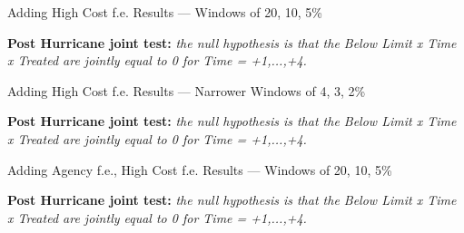 \documentclass{article}
\begin{document}
\clearpage
\pagebreak

\begin{sidewaystable}
    
    \caption{Adding High Cost f.e. Results --- Windows of 20, 10, 5\%}
                
    \begin{center}
    
    \end{center}
                
    \textbf{Post Hurricane joint test:} \emph{the null hypothesis is that the Below Limit x Time x Treated are jointly equal to 0 for Time = +1,...,+4.}

\end{sidewaystable}
                
\clearpage
\pagebreak

\begin{sidewaystable}
    
    \caption{Adding High Cost f.e. Results --- Narrower Windows of 4, 3, 2\%}
                 
    \begin{center}
    
    \end{center}
                
    \textbf{Post Hurricane joint test:} \emph{the null hypothesis is that the Below Limit x Time x Treated are jointly equal to 0 for Time = +1,...,+4.}

\end{sidewaystable}

\clearpage
\pagebreak
                
\begin{sidewaystable}
                    
    \caption{Adding Agency f.e., High Cost f.e. Results --- Windows of 20, 10, 5\%}
                    
    \begin{center}
    
    
\end{center}
                 
    \textbf{Post Hurricane joint test:} \emph{the null hypothesis is that the Below Limit x Time x Treated are jointly equal to 0 for Time = +1,...,+4.}
   
\end{sidewaystable}
\end{document}
